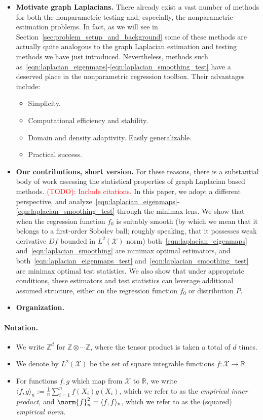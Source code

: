\documentclass{article}
\newcommand{\Reals}{\mathbb{R}}
\newcommand{\1}{\mathbf{1}}
\newcommand{\Xset}{\mathcal{X}}
\newcommand{\Leb}{L}
\newcommand{\dotp}[2]{\langle #1, #2 \rangle}
\theoremstyle{alden}
\theoremstyle{aldenthm}
\theoremstyle{definition}
\theoremstyle{remark}
\begin{document}
\begin{itemize}
	\item \textbf{Motivate graph Laplacians.} There already exist a vast number of methods for both the nonparametric testing and, especially, the nonparametric estimation problems. In fact, as we will see in Section~\ref{sec:problem_setup_and_background} some of these methods are actually quite analogous to the graph Laplacian estimation and testing methods we have just introduced. Nevertheless, methods such as~\eqref{eqn:laplacian_eigenmaps}-\eqref{eqn:laplacian_smoothing_test} have a deserved place in the nonparametric regression toolbox. Their advantages include:
	\begin{itemize}
		\item Simplicity.
		\item Computational efficiency and stability.
		\item Domain and density adaptivity. Easily generalizable. 
		\item Practical success.
	\end{itemize}
	\item \textbf{Our contributions, short version.} For these reasons, there is a  substantial body of work assessing the statistical properties of graph Laplacian based methods. \textcolor{red}{(TODO): Include citations.} In this paper, we adopt a different perspective, and analyze~\eqref{eqn:laplacian_eigenmaps}-\eqref{eqn:laplacian_smoothing_test} through the minimax lens. We show that when the regression function $f_0$ is suitably smooth (by which we mean that it belongs to a first-order Sobolev ball; roughly speaking, that it possesses weak derivative $Df$ bounded in $L^2(\Xset)$ norm) both~\eqref{eqn:laplacian_eigenmaps} and~\eqref{eqn:laplacian_smoothing} are minimax optimal estimators, and both~\eqref{eqn:laplacian_eigenmaps_test} and~\eqref{eqn:laplacian_smoothing_test} are minimax optimal test statistics. We also show that under appropriate conditions, these estimators and test statistics can leverage additional assumed structure, either on the regression function $f_0$ or distribution $P$.
	\item \textbf{Organization.}
\end{itemize}

\paragraph{Notation.}
\begin{itemize}
	\item We write $\mathbb{Z}^d$ for $\mathbb{Z} \otimes \cdots \mathbb{Z}$, where the tensor product is taken a total of $d$ times.
	\item We denote by $\Leb^2(\Xset)$ be the set of square integrable functions $f:\Xset \to \Reals$.
	\item For functions $f,g$ which map from $\Xset$ to $\Reals$, we write $\dotp{f}{g}_n := \frac{1}{n}\sum_{i = 1}^{n} f(X_i) g(X_i)$, which we refer to as the \emph{empirical inner product}, and $\norm{f}_n^2 = \dotp{f}{f}_n$, which we refer to as the (squared) \emph{empirical norm}.
\end{itemize}
\end{document}
